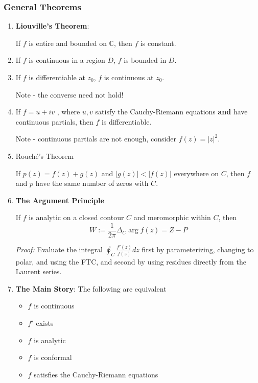 \documentclass{article}
\begin{document}
\subsubsection{General Theorems}
\begin{enumerate}
   \item \textbf{Liouville's Theorem}: 
   
   If $f$ is entire and bounded on $\mathbb{C}$, then $f$ is constant.
   
   \item If $f$ is continuous in a region $D$, $f$ is bounded in $D$.
   
   \item If $f$ is differentiable at $z_0$, $f$ is continuous at $z_0$.
   
   Note - the converse need not hold!
   
   \item If $f = u + iv$ , where $u,v$ satisfy the Cauchy-Riemann equations \textbf{and} have continuous partials, then $f$ is differentiable.
   
   Note - continuous partials are not enough, consider $f(z) = |z|^2$.
   
   \item Rouché's Theorem
   
   If $p(z) = f(z) + g(z)$ and $|g(z)| < |f(z)|$ everywhere on $C$, then $f$ and $p$ have the same number of zeros with $C$.
   
   
   \item \textbf{The Argument Principle}
   
   If $f$ is analytic on a closed contour $C$ and meromorphic within $C$, then
   \[
   W := \frac{1}{2\pi}\Delta_C \arg f(z) = Z - P
   \]
   
   \textit{Proof:} Evaluate the integral $\oint_C \frac{f'(z)}{f(z)} dz$ first by parameterizing, changing to polar, and using the FTC, and second by using residues directly from the Laurent series.
   
   \item \textbf{The Main Story}: The following are equivalent
   
   \begin{itemize}
       \item $f$ is continuous
       \item $f'$ exists
       \item $f$ is analytic
       \item $f$ is conformal
       \item $f$ satisfies the Cauchy-Riemann equations
   \end{itemize}
   
\end{enumerate}
\end{document}
